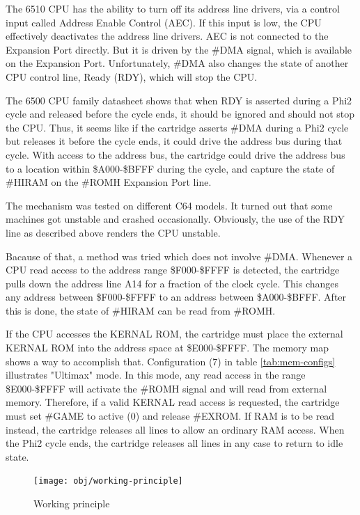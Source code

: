 \documentclass[a4paper,oneside]{memoir}
\begin{document}
The 6510 CPU has the ability to turn off its address line
drivers, via a control input called Address Enable Control (AEC). If
this input is low, the CPU effectively deactivates the address line
drivers. AEC is not connected to the Expansion
Port directly. But it is driven by the \#DMA signal, which is
available on the Expansion Port. Unfortunately, \#DMA also changes
the state of another CPU control line, Ready (RDY), which will stop
the CPU.

The 6500 CPU family datasheet shows that when RDY is asserted during a Phi2 cycle and released before the cycle ends, 
it should be ignored and should not stop the CPU. 
Thus, it seems like if the cartridge asserts \#DMA during a Phi2 cycle but releases it before the cycle ends, 
it could drive the address bus during that cycle.
With access to the address bus, the cartridge could drive the address bus to a location within \$A000-\$BFFF
during the cycle, and capture the state of \#HIRAM on the \#ROMH Expansion Port line.

The mechanism was tested on different C64 models. 
It turned out that some machines got unstable and crashed occasionally.
Obviously, the use of the RDY line as described above renders the CPU unstable.

Bacause of that, a method was tried which does not involve \#DMA.
Whenever a CPU read access to the address range \$F000-\$FFFF is detected, 
the cartridge pulls down the address line A14 for a fraction of the clock cycle.
This changes any address between \$F000-\$FFFF to an address between \$A000-\$BFFF.
After this is done, the state of \#HIRAM can be read from \#ROMH.

If the CPU accesses the KERNAL ROM, the cartridge must place the external KERNAL ROM into the address space at \$E000-\$FFFF.
The memory map shows a way to accomplish that.
Configuration (7) in table \ref {tab:mem-configs} illustrates "Ultimax" mode.
In this mode, any read access in the range \$E000-\$FFFF will activate the \#ROMH signal and will read from external memory.
Therefore, if a valid KERNAL read access is requested, the cartridge must set \#GAME to active (0) and release \#EXROM.
If RAM is to be read instead, the cartridge releases all lines to allow an ordinary RAM access.
When the Phi2 cycle ends, the cartridge releases all lines in any case to return to idle state.

\begin{figure}
    \centering
    \texttt{[image: obj/working-principle]}
    \caption{Working principle}
    \label{fig:working-principle}
\end{figure}
\end{document}
